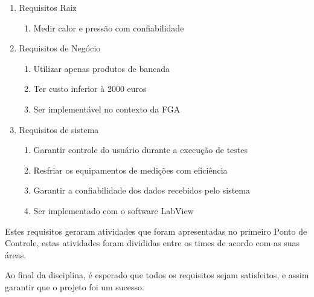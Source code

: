 \begin{enumerate}
	\item Requisitos Raiz
		\begin{enumerate}[start=1,label*={\arabic*}]
			\item Medir calor e pressão com confiabilidade
		\end{enumerate}
	
	\item Requisitos de Negócio
		\begin{enumerate}[start=2,label*={\arabic*}]
			\item Utilizar apenas produtos de bancada
			\item Ter custo inferior à 2000 euros
			\item Ser implementável no contexto da FGA
		\end{enumerate}

	\item Requisitos de sistema
		\begin{enumerate}[start=3,label*={\arabic*}]
			\item Garantir controle do usuário durante a execução de testes
			\item Resfriar os equipamentos de medições com eficiência
			\item Garantir a confiabilidade dos dados recebidos pelo sistema
			\item Ser implementado com o software LabView
		\end{enumerate}
\end{enumerate}

Estes requisitos geraram atividades que foram apresentadas no primeiro Ponto de Controle, estas atividades foram divididas entre os times de acordo com as suas áreas.

Ao final da disciplina, é esperado que todos os requisitos sejam satisfeitos, e assim garantir que o projeto foi um sucesso.
